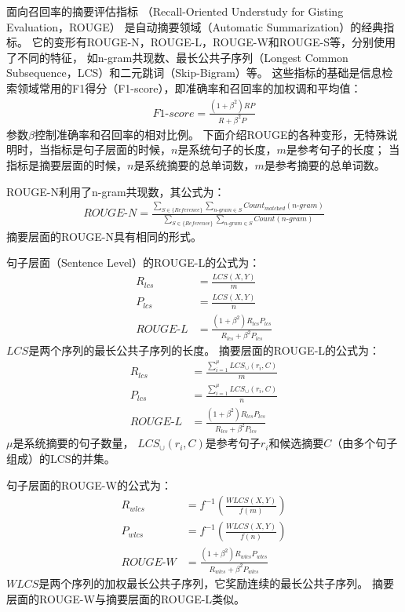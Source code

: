 面向召回率的摘要评估指标
（Recall-Oriented Understudy for Gisting Evaluation，ROUGE）
是自动摘要领域（Automatic Summarization）的经典指标。
它的变形有ROUGE-N，ROUGE-L，ROUGE-W和ROUGE-S等，分别使用了不同的特征，
如n-gram共现数、最长公共子序列（Longest Common Subsequence，LCS）和二元跳词（Skip-Bigram）等。
这些指标的基础是信息检索领域常用的F1得分（F1-score），即准确率和召回率的加权调和平均值：
\begin{align}
    \textit{F1-score} = \frac{(1 + \beta^2) RP}{R + \beta^2 P}
\end{align}
参数$\beta$控制准确率和召回率的相对比例。
下面介绍ROUGE的各种变形，无特殊说明时，当指标是句子层面的时候，$n$是系统句子的长度，$m$是参考句子的长度；
当指标是摘要层面的时候，$n$是系统摘要的总单词数，$m$是参考摘要的总单词数。

ROUGE-N利用了n-gram共现数，其公式为：
\begin{align}
    \textit{ROUGE-N} = \frac{
    \sum_{S \in \{\textit{Reference}\}}
    \sum_{\textit{n-gram} \in S}
    \textit{Count}_\textit{matched}(\textit{n-gram})
    }{
    \sum_{S \in \{\textit{Reference}\}}
    \sum_{\textit{n-gram} \in S}
    \textit{Count}(\textit{n-gram})
    }
\end{align}
摘要层面的ROUGE-N具有相同的形式。

句子层面（Sentence Level）的ROUGE-L的公式为：
\begin{align}
    R_{lcs} &= \frac{\textit{LCS}(X, Y)}{m} \\
    P_{lcs} &= \frac{\textit{LCS}(X, Y)}{n} \\
    \textit{ROUGE-L} &= \frac{(1 + \beta^2) R_{lcs}P_{lcs}}
    {R_{lcs} + \beta^2 P_{lcs}}
\end{align}
$LCS$是两个序列的最长公共子序列的长度。
摘要层面的ROUGE-L的公式为：
\begin{align}
    R_{lcs} &= \frac{\sum_{i=1}^\mu \textit{LCS}_\cup(r_i, C)}{m} \\
    P_{lcs} &= \frac{\sum_{i=1}^\mu \textit{LCS}_\cup(r_i, C)}{n} \\
    \textit{ROUGE-L} &= \frac{(1 + \beta^2) R_{lcs}P_{lcs}}{R_{lcs} + \beta^2 P_{lcs}}
\end{align}
$\mu$是系统摘要的句子数量，
$\textit{LCS}_\cup(r_i, C)$是参考句子$r_i$和候选摘要$C$（由多个句子组成）的LCS的并集。

句子层面的ROUGE-W的公式为：
\begin{align}
    R_{wlcs} &= f^{-1} \left( \frac{\textit{WLCS}(X, Y)}{f(m)} \right) \\
    P_{wlcs} &= f^{-1} \left( \frac{\textit{WLCS}(X, Y)}{f(n)} \right) \\
    \textit{ROUGE-W} &= \frac{(1 + \beta^2) R_{wlcs}P_{wlcs}}{R_{wlcs} + \beta^2 P_{wlcs}}
\end{align}
$\textit{WLCS}$是两个序列的加权最长公共子序列，它奖励连续的最长公共子序列。
摘要层面的ROUGE-W与摘要层面的ROUGE-L类似。

